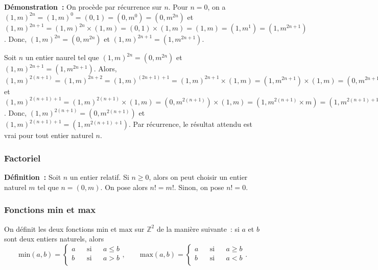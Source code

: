 \medskip

\noindent\textbf{Démonstration :} On procède par récurrence sur $n$.
    Pour $n = 0$, on a $(1,m)^{2n} = (1,m)^0 = (0,1) = (0,m^0) = (0,m^{2 n})$ et $(1,m)^{2n+1} = (1,m)^{2 n} \times (1,m) = (0,1) \times (1,m) = (1,m) = (1,m^1) = (1,m^{2 n + 1})$. 
    Donc, $(1,m)^{2n} = (0,m^{2 n})$ et $(1,m)^{2n+1} = (1,m^{2 n + 1})$. 
    
    Soit $n$ un entier naurel tel que $(1,m)^{2n} = (0,m^{2 n})$ et $(1,m)^{2n+1} = (1,m^{2 n + 1})$. 
    Alors, $(1,m)^{2(n+1)} = (1,m)^{2n + 2} = (1,m)^{(2n+1)+1} = (1,m)^{2n+1} \times (1,m) = (1, m^{2n+1}) \times (1,m) = (0,m^{2n+1} \times m) = (0, m^{2n+1+1}) = (0, m^{2(n+1)})$ et $(1,m)^{2(n+1)+1} = (1,m)^{2(n+1)} \times (1,m) = (0, m^{2(n+1)}) \times (1,m) = (1,m^{2(n+1)} \times m) = (1, m^{2(n+1)+1})$. 
    Donc, $(1,m)^{2(n+1)} = (0, m^{2(n+1)})$ et $(1,m)^{2(n+1)+1} = (1, m^{2(n+1)+1})$. 
    Par récurrence, le résultat attendu est vrai pour tout entier naturel $n$.

   \done 

\subsubsection{Factoriel}

\noindent\textbf{Définition :} Soit $n$ un entier relatif. 
    Si $n \geq 0$, alors on peut choisir un entier naturel $m$ tel que $n = (0,m)$. 
    On pose alors $n! = m!$. 
    Sinon, on pose $n! = 0$.

\subsubsection{Fonctions min et max}

On définit les deux fonctions $\mathrm{min}$ et $\mathrm{max}$ sur $\mathbb{Z}^2$ de la manière suivante : si $a$ et $b$ sont deux entiers naturels, alors 
\begin{equation*}
    \mathrm{min}(a,b) = \left\lbrace \begin{aligned}
        a & & \text{si} & & a \leq b \\
        b & & \text{si} & & a > b \\
    \end{aligned} \right. 
    , \qquad
    \mathrm{max}(a,b) = \left\lbrace \begin{aligned}
        a & & \text{si} & & a \geq b \\
        b & & \text{si} & & a < b \\
    \end{aligned} \right. 
    .
\end{equation*}

